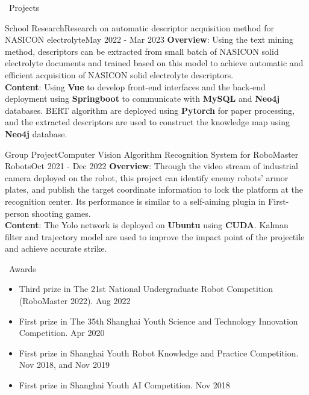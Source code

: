 \documentclass[UTF8]{resume}
\begin{document}
\begin{rSection}{\faUsers~Projects}

    \begin{rProject}{School Research}{Research on automatic descriptor acquisition method for NASICON electrolyte}{May 2022 - Mar 2023}
        \textbf{Overview}: Using the text mining method, descriptors can be extracted from small batch of NASICON solid electrolyte documents and trained based on this model to achieve automatic and efficient acquisition of NASICON solid electrolyte descriptors.\\
        \textbf{Content}: Using \textbf{Vue} to develop front-end interfaces and the back-end deployment using \textbf{Springboot} to communicate with \textbf{MySQL} and \textbf{Neo4j} databases. BERT algorithm are deployed using \textbf{Pytorch} for paper processing, and the extracted descriptors are used to construct the knowledge map using \textbf{Neo4j} database.
    \end{rProject}

    \begin{rProject}{Group Project}{Computer Vision Algorithm Recognition System for RoboMaster Robots}{Oct 2021 - Dec 2022}
        \textbf{Overview}: Through the video stream of industrial camera deployed on the robot, this project can identify enemy robots' armor plates, and publish the target coordinate information to lock the platform at the recognition center. Its performance is similar to a self-aiming plugin in First-person shooting games.\\
        \textbf{Content}: The Yolo network is deployed on \textbf{Ubuntu} using \textbf{CUDA}. Kalman filter and trajectory model are used to improve the impact point of the projectile and achieve accurate strike.
    \end{rProject}

\end{rSection}

\begin{rSection}{\faAward~Awards}
    \begin{itemize}
        \itemsep -0.5em
        \item Third prize in The 21st National Undergraduate Robot Competition (RoboMaster 2022). \hfill Aug 2022
        \item First prize in The 35th Shanghai Youth Science and Technology Innovation Competition. \hfill Apr 2020
        \item First prize in Shanghai Youth Robot Knowledge and Practice Competition. \hfill Nov 2018, and Nov 2019
        \item First prize in Shanghai Youth AI Competition. \hfill Nov 2018
    \end{itemize}
\end{rSection}
\end{document}
